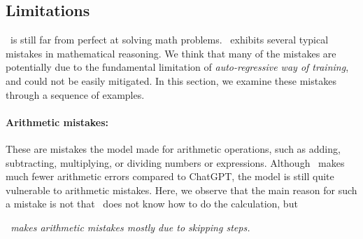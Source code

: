 \begin{comment}
\begin{tcolorbox}[colback=white!5!white, enhanced, attach boxed title to top center={yshift=-3mm}, title=ChatGPT]
\begin{verbatim}
Suppose X is a random variable that represents the value of sin(x). The probability distribution of X is such that P(X=0.88) = 0.2 and P(X=-0.88) = 0.2, and P(X=0) = 0.6. Let Y be a random variable that represents the value of sin(2x). Find the probability distribution of Y.
\end{verbatim}
\end{tcolorbox}

\begin{tcolorbox}[colback=white!5!white, enhanced, attach boxed title to top center={yshift=-3mm}, title={\DV}]
\begin{verbatim}
Suppose X is a random variable that takes values in the interval [0, 2pi) with a uniform distribution. Let Y = sin(X) and Z = sin(2X). Find the probability that Z > 1.5 given that Y > 0.8
\end{verbatim}
\end{tcolorbox}
\end{figure}


\end{comment}


\subsection{Limitations}

\DV \ is still far from perfect at solving math problems. \DV \ exhibits several typical mistakes in mathematical reasoning. We think that many of the mistakes are potentially due to the fundamental limitation of \emph{auto-regressive way of training}, and could not be easily mitigated. In this section, we examine these mistakes through a sequence of examples.%

\paragraph{Arithmetic mistakes:} These are mistakes the model made for arithmetic operations, such as adding, subtracting, multiplying, or dividing numbers or expressions. Although \DV \ makes much fewer arithmetic errors compared to ChatGPT, the model is still quite vulnerable to arithmetic mistakes. Here, we observe that the main reason for such a mistake is not that \DV \ does not know how to do the calculation, but 
\begin{center}
\emph{\DV \ makes arithmetic mistakes mostly due to skipping steps.}
\end{center}

